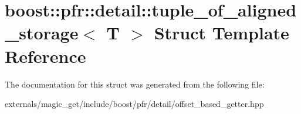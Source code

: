 \hypertarget{structboost_1_1pfr_1_1detail_1_1tuple__of__aligned__storage}{}\section{boost\+:\+:pfr\+:\+:detail\+:\+:tuple\+\_\+of\+\_\+aligned\+\_\+storage$<$ T $>$ Struct Template Reference}
\label{structboost_1_1pfr_1_1detail_1_1tuple__of__aligned__storage}


The documentation for this struct was generated from the following file\+:\begin{DoxyCompactItemize}
\item 
externals/magic\+\_\+get/include/boost/pfr/detail/offset\+\_\+based\+\_\+getter.\+hpp\end{DoxyCompactItemize}

